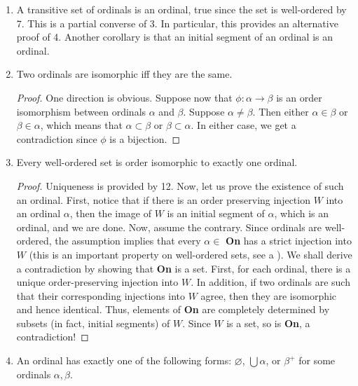 \documentclass[12pt]{article}
\begin{document}
\begin{enumerate}
\begin{proof}
Now, pick any $\delta\in A$.  Then $\delta\subseteq \bigcup A=\alpha$, so either $\delta=\alpha$ or $\delta\subset \alpha$.  In the latter case, we get $\delta\in \alpha$ by 5.  This shows that $\alpha$ is an upper bound of $A$.  If $\theta$ is an ordinal such that $\delta\in \theta$ for every $\delta \in A$, then $\delta \subset \theta$, which implies $\alpha \subset \theta$, so that $\alpha \in \theta$ by 5, showing that $\alpha$ is the least upper bound of $A$.
\end{proof}
\item A transitive set of ordinals is an ordinal, true since the set is well-ordered by 7.  This is a partial converse of 3.  In particular, this provides an alternative proof of 4.  Another corollary is that an initial segment of an ordinal is an ordinal.
\item Two ordinals are isomorphic iff they are the same.
\begin{proof}  One direction is obvious.  Suppose now that $\phi: \alpha\to \beta$ is an order isomorphism between ordinals $\alpha$ and $\beta$.  Suppose $\alpha\ne \beta$.  Then either $\alpha\in \beta$ or $\beta\in \alpha$, which means that $\alpha\subset \beta$ or $\beta\subset \alpha$.  In either case, we get a contradiction since $\phi$ is a bijection.
\end{proof}
\item Every well-ordered set is order isomorphic to exactly one ordinal.
\begin{proof}  Uniqueness is provided by 12.  Now, let us prove the existence of such an ordinal.  First, notice that if there is an order preserving injection $W$ into an ordinal $\alpha$, then the image of $W$ is an initial segment of $\alpha$, which is an ordinal, and we are done.  Now, assume the contrary.  Since ordinals are well-ordered, the assumption implies that every $\alpha \in $ \textbf{On} has a strict injection into $W$ (this is an important property on well-ordered sets, see a ).  We shall derive a contradiction by showing that \textbf{On} is a set.  First, for each ordinal, there is a unique order-preserving injection into $W$.  In addition, if two ordinals are such that their corresponding injections into $W$ agree, then they are isomorphic and hence identical.  Thus, elements of \textbf{On} are completely determined by subsets (in fact, initial segments) of $W$.  Since $W$ is a set, so is \textbf{On}, a contradiction!
\end{proof}
\item An ordinal has exactly one of the following forms: $\varnothing$, $\bigcup \alpha$, or $\beta^+$ for some ordinals $\alpha,\beta$.

\end{enumerate}
\end{document}
